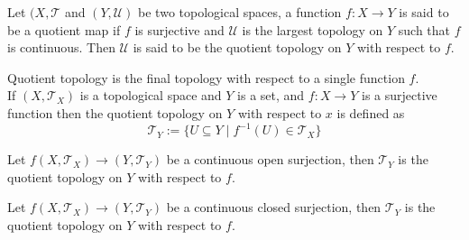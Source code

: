 \vspace{0.4cm}
\begin{definition}
    Let $(X,\mathcal{T}$ and $(Y,\mathcal{U})$ be two topological spaces, a function $f:X\to Y$ is said to be a quotient map if $f$ is surjective and $\mathcal{U}$ is the largest topology on $Y$ such that $f$ is continuous. Then $\mathcal{U}$ is said to be the quotient topology on $Y$ with respect to $f$.
\end{definition}
\vspace{0.4cm}
\begin{remark}[]
    Quotient topology is the final topology with respect to a single function $f$.\\ 
    If $(X,\mathcal{T}_{X})$ is a topological space and $Y$ is a set, and $f:X\to Y$ is a surjective function then the quotient topology on $Y$ with respect to $x$ is defined as $$\mathcal{T}_{Y}:=\{U\subseteq Y\mid f^{-1}(U)\in \mathcal{T}_{X}\}$$
\end{remark}
\vspace{0.4cm}
\begin{theorem}[]
    Let $f(X,\mathcal{T}_{X})\to(Y,\mathcal{T}_{Y})$ be a continuous open surjection, then $\mathcal{T}_{Y}$ is the quotient topology on $Y$ with respect to $f$.
\end{theorem}
\vspace{0.4cm}
\begin{theorem}[]
    Let $f(X,\mathcal{T}_{X})\to(Y,\mathcal{T}_{Y})$ be a continuous closed surjection, then $\mathcal{T}_{Y}$ is the quotient topology on $Y$ with respect to $f$.
\end{theorem}
